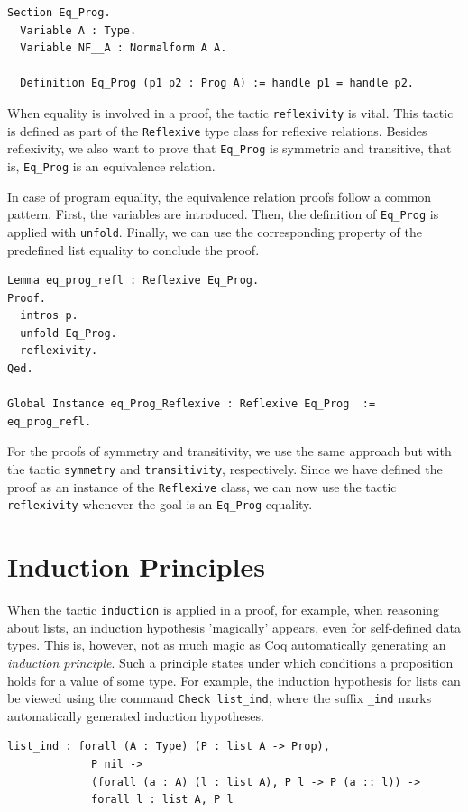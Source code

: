 \documentclass[a4paper, 11pt, fleqn, twoside]{scrreprt}
\newcommand{\cinl}[1]{\texttt{#1}}
\begin{document}
\begin{verbatim}
Section Eq_Prog.
  Variable A : Type.
  Variable NF__A : Normalform A A.

  Definition Eq_Prog (p1 p2 : Prog A) := handle p1 = handle p2.
\end{verbatim}

When equality is involved in a proof, the tactic \cinl{reflexivity} is vital.
This tactic is defined as part of the \cinl{Reflexive} type class for reflexive relations.
Besides reflexivity, we also want to prove that \cinl{Eq_Prog} is symmetric and transitive, that is, \cinl{Eq_Prog} is an equivalence relation.

In case of program equality, the equivalence relation proofs follow a common pattern.
First, the variables are introduced.
Then, the definition of \cinl{Eq_Prog} is applied with \cinl{unfold}.
Finally, we can use the corresponding property of the predefined list equality to conclude the proof.

\begin{verbatim}
Lemma eq_prog_refl : Reflexive Eq_Prog.
Proof. 
  intros p.
  unfold Eq_Prog.
  reflexivity.
Qed.

Global Instance eq_Prog_Reflexive : Reflexive Eq_Prog  := eq_prog_refl.
\end{verbatim}

For the proofs of symmetry and transitivity, we use the same approach but with the tactic \cinl{symmetry} and \cinl{transitivity}, respectively.
Since we have defined the proof as an instance of the \cinl{Reflexive} class, we can now use the tactic \cinl{reflexivity} whenever the goal is an \cinl{Eq_Prog} equality.

\section{Induction Principles}

When the tactic \cinl{induction} is applied in a proof, for example, when reasoning about lists, an induction hypothesis 'magically' appears, even for self-defined data types.
This is, however, not as much magic as Coq automatically generating an \textit{induction principle}.
Such a principle states under which conditions a proposition holds for a value of some type.
For example, the induction hypothesis for lists can be viewed using the command \cinl{Check list_ind}, where the suffix \cinl{_ind} marks automatically generated induction hypotheses.

\begin{verbatim}
list_ind : forall (A : Type) (P : list A -> Prop),
             P nil ->
             (forall (a : A) (l : list A), P l -> P (a :: l)) ->
             forall l : list A, P l
\end{verbatim}
\end{document}
